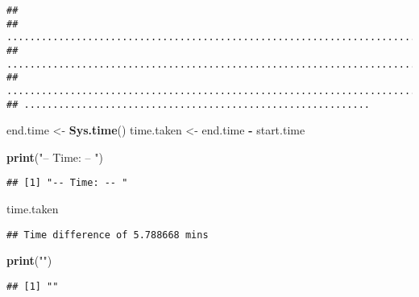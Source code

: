 \documentclass[
]{article}
\newenvironment{Shaded}{\begin{snugshade}}{\end{snugshade}}
\newcommand{\KeywordTok}[1]{\textcolor[rgb]{0.13,0.29,0.53}{\textbf{#1}}}
\newcommand{\NormalTok}[1]{#1}
\newcommand{\OperatorTok}[1]{\textcolor[rgb]{0.81,0.36,0.00}{\textbf{#1}}}
\newcommand{\StringTok}[1]{\textcolor[rgb]{0.31,0.60,0.02}{#1}}
\begin{document}
\begin{verbatim}
## 
## ................................................................................
## ................................................................................
## ................................................................................
## ............................................................
\end{verbatim}

\begin{Shaded}
\begin{Highlighting}[]
\NormalTok{end.time <-}\StringTok{ }\KeywordTok{Sys.time}\NormalTok{()}
\NormalTok{time.taken <-}\StringTok{ }\NormalTok{end.time }\OperatorTok{-}\StringTok{ }\NormalTok{start.time}

\KeywordTok{print}\NormalTok{(}\StringTok{"-- Time: -- "}\NormalTok{)}
\end{Highlighting}
\end{Shaded}

\begin{verbatim}
## [1] "-- Time: -- "
\end{verbatim}

\begin{Shaded}
\begin{Highlighting}[]
\NormalTok{time.taken}
\end{Highlighting}
\end{Shaded}

\begin{verbatim}
## Time difference of 5.788668 mins
\end{verbatim}

\begin{Shaded}
\begin{Highlighting}[]
\KeywordTok{print}\NormalTok{(}\StringTok{""}\NormalTok{)}
\end{Highlighting}
\end{Shaded}

\begin{verbatim}
## [1] ""
\end{verbatim}
\end{document}
